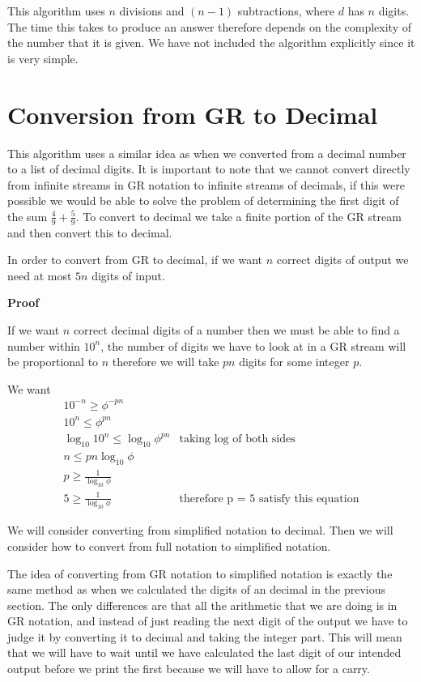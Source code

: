 \documentclass{cs4rep}
\begin{document}
This algorithm uses $n$ divisions and $(n-1)$ subtractions, where $d$
has $n$ digits. The time this takes to produce an answer therefore
depends on the complexity of the number that it is given. We have not included the algorithm explicitly since it is very simple.


\section{Conversion from GR to Decimal}

This algorithm uses a similar idea as when we converted from a decimal
number to a list of decimal digits. It is important to note that we
cannot convert directly from infinite streams in GR notation to
infinite streams of decimals, if this were possible we would be able
to solve the problem of determining the first digit of the sum
$\frac{4}{9} + \frac{5}{9}$. To convert to decimal we take a finite
portion of the GR stream and then convert this to decimal.


\begin{myprop}
  In order to convert from GR to decimal, if we want $n$ correct digits of output we need at most $5n$ digits
  of input.
\end{myprop}

{\bf Proof}

If we want $n$ correct decimal digits of a number then we must be able
to find a number within $10^{n}$, the number of digits we have to look
at in a GR stream will be proportional to $n$ therefore we will take
$pn$ digits for some integer $p$.

We want 
\[ \begin{array}{ll}
10^{-n} \geq \phi^{-pn} \\
10^{n} \leq \phi^{pn} \\
\log_{10} 10^{n} \leq \log_{10} \phi^{pn} & \mbox{taking } \log \mbox{ of both sides } \\
n \leq pn \log_{10} \phi \\
p \geq \frac{1}{\log_{10} \phi} \\
5 \geq \frac{1}{\log_{10} \phi} & \mbox{therefore p = 5 satisfy this equation}
\end{array} \]

We will consider converting from simplified notation to decimal. Then we will consider how to convert from full notation to simplified notation.

The idea of converting from GR notation to simplified notation is
exactly the same method as when we calculated the digits of an decimal
in the previous section.  The only differences are that all the
arithmetic that we are doing is in GR notation, and instead of just
reading the next digit of the output we have to judge it by converting
it to decimal and taking the integer part. This will mean that we will
have to wait until we have calculated the last digit of our intended
output before we print the first because we will have to allow for a
carry.
\end{document}
